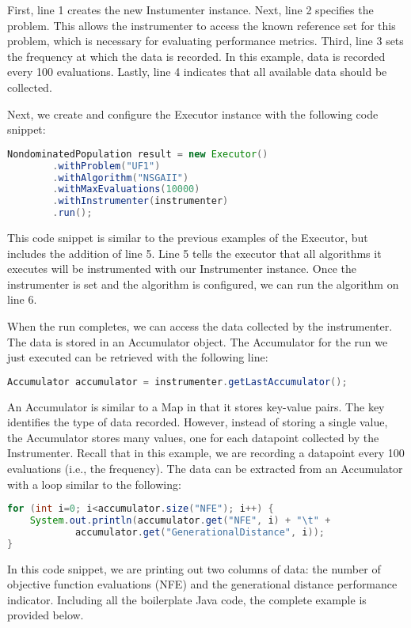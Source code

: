 First, line 1 creates the new Instumenter instance.  Next, line 2 specifies the problem.  This allows the instrumenter to access the known reference set for this problem, which is necessary for evaluating performance metrics.  Third, line 3 sets the frequency at which the data is recorded.  In this example, data is recorded every 100 evaluations.  Lastly, line 4 indicates that all available data should be collected.

Next, we create and configure the Executor instance with the following code snippet:

\begin{lstlisting}[language=Java]
NondominatedPopulation result = new Executor()
		.withProblem("UF1")
		.withAlgorithm("NSGAII")
		.withMaxEvaluations(10000)
		.withInstrumenter(instrumenter)
		.run();
\end{lstlisting}

This code snippet is similar to the previous examples of the Executor, but includes the addition of line 5.  Line 5 tells the executor that all algorithms it executes will be instrumented with our Instrumenter instance.  Once the instrumenter is set and the algorithm is configured, we can run the algorithm on line 6.

When the run completes, we can access the data collected by the instrumenter.  The data is stored in an Accumulator object.  The Accumulator for the run we just executed can be retrieved with the following line:

\begin{lstlisting}[language=Java]
Accumulator accumulator = instrumenter.getLastAccumulator();
\end{lstlisting}

An Accumulator is similar to a Map in that it stores key-value pairs.  The key identifies the type of data recorded.  However, instead of storing a single value, the Accumulator stores many values, one for each datapoint collected by the Instrumenter.  Recall that in this example, we are recording a datapoint every 100 evaluations (i.e., the frequency).  The data can be extracted from an Accumulator with a loop similar to the following:

\begin{lstlisting}[language=Java]
for (int i=0; i<accumulator.size("NFE"); i++) {
	System.out.println(accumulator.get("NFE", i) + "\t" +  
			accumulator.get("GenerationalDistance", i));
}
\end{lstlisting}

In this code snippet, we are printing out two columns of data: the number of objective function evaluations (NFE) and the generational distance performance indicator.  Including all the boilerplate Java code, the complete example is provided below.

